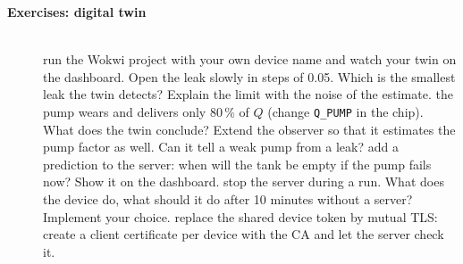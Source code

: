 \begin{description}
\item[{\rot\bf Exercises: digital twin}]~\\[-\lblskip]
\bi
	\ite run the Wokwi project with your own device name and watch your twin on the dashboard. Open the leak slowly in steps of 0.05. Which is the smallest leak the twin detects? Explain the limit with the noise of the estimate.
	\ite the pump wears and delivers only 80\,\% of $Q$ (change \texttt{Q\_PUMP} in the chip). What does the twin conclude? Extend the observer so that it estimates the pump factor as well. Can it tell a weak pump from a leak?
	\ite add a prediction to the server: when will the tank be empty if the pump fails now? Show it on the dashboard.
	\ite stop the server during a run. What does the device do, what should it do after 10 minutes without a server? Implement your choice.
	\ite replace the shared device token by mutual TLS: create a client certificate per device with the CA and let the server check it.
\ei
\os{\newpage}
\end{description}
